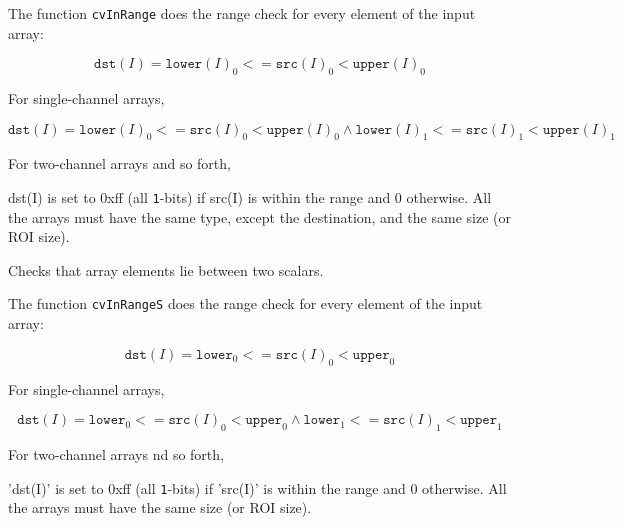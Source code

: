 \begin{description}
\end{description}


The function \texttt{cvInRange} does the range check for every element of the input array:

\[
\texttt{dst}(I)=\texttt{lower}(I)_0 <= \texttt{src}(I)_0 < \texttt{upper}(I)_0
\]

For single-channel arrays,

\[
\texttt{dst}(I)=
\texttt{lower}(I)_0 <= \texttt{src}(I)_0 < \texttt{upper}(I)_0 \land
\texttt{lower}(I)_1 <= \texttt{src}(I)_1 < \texttt{upper}(I)_1
\]

For two-channel arrays and so forth,

dst(I) is set to 0xff (all \texttt{1}-bits) if src(I) is within the range and 0 otherwise. All the arrays must have the same type, except the destination, and the same size (or ROI size).


\label{InRangeS}

Checks that array elements lie between two scalars.


\begin{description}
\end{description}


The function \texttt{cvInRangeS} does the range check for every element of the input array:

\[
\texttt{dst}(I)=\texttt{lower}_0 <= \texttt{src}(I)_0 < \texttt{upper}_0
\]

For single-channel arrays,

\[
\texttt{dst}(I)=
\texttt{lower}_0 <= \texttt{src}(I)_0 < \texttt{upper}_0 \land
\texttt{lower}_1 <= \texttt{src}(I)_1 < \texttt{upper}_1
\]

For two-channel arrays nd so forth,

'dst(I)' is set to 0xff (all \texttt{1}-bits) if 'src(I)' is within the range and 0 otherwise. All the arrays must have the same size (or ROI size).

